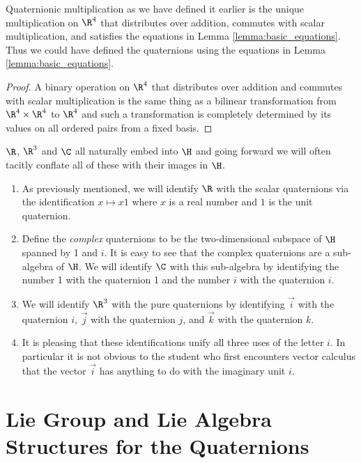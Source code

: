 \documentclass[oneside,12pt]{amsart}
\begin{document}
 \begin{lemma}
 Quaternionic multiplication as we have defined it earlier is the unique multiplication on $\R^4$ 
that distributes over addition, commutes with scalar multiplication,
 and satisfies the equations in Lemma \ref{lemma:basic_equations}. Thus we could have defined the quaternions
 using the equations in Lemma \ref{lemma:basic_equations}.
 \end{lemma}
 \begin{proof}
 A binary operation on $\R^4$ that distributes over addition and commutes with scalar multiplication
 is the same thing as a bilinear transformation from $\R^4 \times \R^4$ to $\R^4$ and such a transformation
 is completely determined by its values on all ordered pairs from a fixed basis.
 \end{proof}

 \begin{remarks} $\R$, $\R^3$ and $\C$ all naturally embed into $\H$ and going forward we will often
 tacitly conflate all of these with their images in $\H$.
 \begin{enumerate}
 \item As previously mentioned, we will identify $\R$ with the scalar quaternions via the identification $x\mapsto x 1$ where $x$ is a
 real number and $1$ is the unit quaternion.
 \item Define the \emph{complex} quaternions to be the two-dimensional subspace of $\H$ spanned by 1 and $i$.
 It is easy to see that the complex quaternions are a sub-algebra of $\H$.
 We will identify $\C$ with this sub-algebra by identifying the number 1 with the quaternion 1 and the
 number $i$ with the quaternion $i$.
 \item We will identify $\R^3$ with the pure quaternions by identifying $\vec{i}$ with the quaternion $i$,
 $\vec{j}$ with the quaternion $j$, and $\vec{k}$ with the quaternion $k$.
 \item It is pleasing that these identifications unify all three uses of the letter $i$. In particular it is
 not obvious to the student who first encounters vector calculus that the vector $\vec{i}$ has anything
 to do with the imaginary unit $i$.
 \end{enumerate}
 \end{remarks}

 \section{Lie Group and Lie Algebra Structures for the Quaternions}
\end{document}
